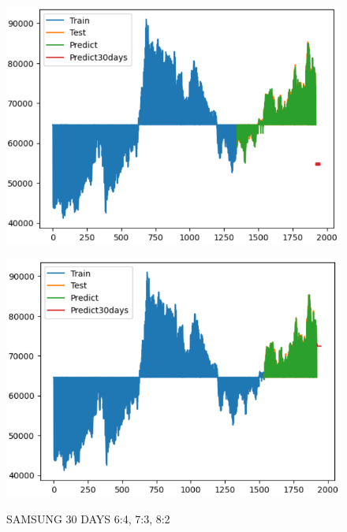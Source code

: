 \documentclass{article}
\begin{document}
\begin{multicols}{2}
\begin{figure}[H]
\begin{minipage}{0.15\textwidth}
    \label{fig:1}
    \end{minipage}%
    \begin{minipage}{0.15\textwidth}
    \centering
    \includegraphics[width=1\textwidth]{Image/XGBoost/SAMSUNG_7_3_30.png}
  
    \label{fig:2}
    \end{minipage}%
    \begin{minipage}{0.15\textwidth}
    \centering
    \includegraphics[width=1\textwidth]{Image/XGBoost/SAMSUNG_8_2_30.png}

    \label{fig:3}
    \end{minipage}
    \caption{SAMSUNG 30 DAYS  6:4, 7:3, 8:2 }
\end{figure}



\end{multicols}
\end{document}
